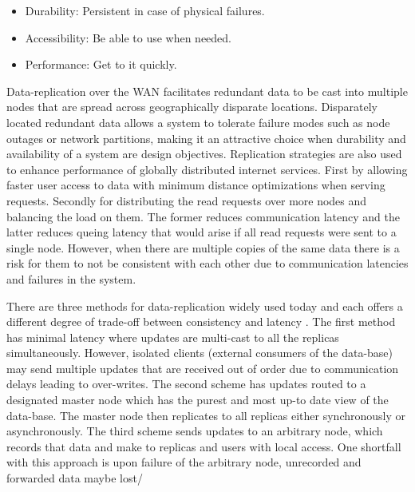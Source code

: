 \documentclass[conference]{IEEEtran}
\begin{document}
\begin{itemize}
	\item Durability: Persistent in case of physical failures.
	\item Accessibility: Be able to use when needed.
	\item Performance: Get to it quickly.
\end{itemize}

Data-replication over the WAN facilitates redundant data to be cast into multiple nodes that are spread across geographically disparate locations. Disparately located redundant data allows a system to tolerate failure modes such as node outages or network partitions, making it an attractive choice when durability and availability of a system are design objectives. Replication strategies are also used to enhance performance of globally distributed internet services. First by allowing faster user access to data with minimum distance optimizations when serving requests. Secondly for distributing the read requests over more nodes and balancing the load on them. The former reduces communication latency and the latter reduces queing latency that would arise if all read requests were sent to a single node. However, when there are multiple copies of the same data there is a risk for them to not be consistent with each other due to communication latencies and failures in the system.

There are three methods for data-replication widely used today and each offers a different degree of trade-off between consistency and latency \cite{Abadi}. The first method has minimal latency where updates are multi-cast to all the replicas simultaneously. However, isolated clients (external consumers of the data-base) may send multiple updates that are received out of order due to communication delays leading to over-writes. The second scheme has updates routed to a designated master node which has the purest and most up-to date view of the data-base. The master node then replicates to all replicas either synchronously or asynchronously. The third scheme sends updates to an arbitrary node, which records that data and make to replicas and users with local access. One shortfall with this approach is upon failure of the arbitrary node, unrecorded and forwarded data maybe lost/
\end{document}
